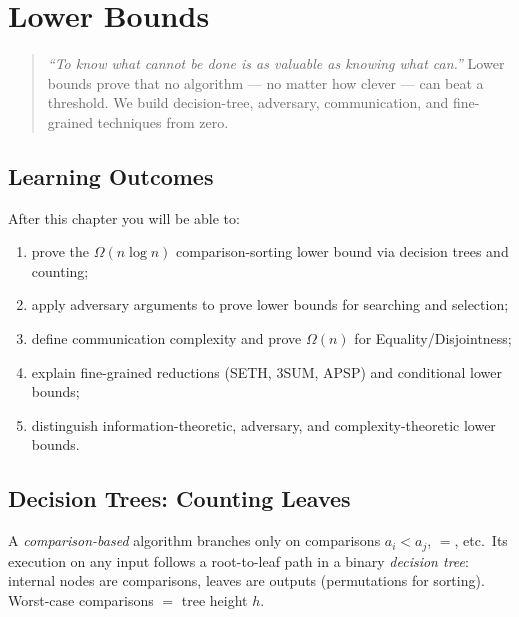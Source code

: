 \chapter{Lower Bounds}
\label{ch:lowerbounds}

\begin{quote}
\emph{``To know what cannot be done is as valuable as knowing what can.''}
Lower bounds prove that no algorithm --- no matter how clever --- can beat a threshold. We build decision-tree, adversary, communication, and fine-grained techniques from zero.
\end{quote}

\noindent{}
\vspace{0.4em}

\section*{Learning Outcomes}
After this chapter you will be able to:
\begin{enumerate}[label=(L\arabic*)]
    \item prove the $\Omega(n\log n)$ comparison-sorting lower bound via decision trees and counting;
    \item apply adversary arguments to prove lower bounds for searching and selection;
    \item define communication complexity and prove $\Omega(n)$ for Equality/Disjointness;
    \item explain fine-grained reductions (SETH, 3SUM, APSP) and conditional lower bounds;
    \item distinguish information-theoretic, adversary, and complexity-theoretic lower bounds.
\end{enumerate}

\section{Decision Trees: Counting Leaves}
\label{sec:decision-trees}

A \emph{comparison-based} algorithm branches only on comparisons $a_i<a_j$, $=$, etc.\ Its execution on any input follows a root-to-leaf path in a binary \emph{decision tree}: internal nodes are comparisons, leaves are outputs (permutations for sorting). Worst-case comparisons $=$ tree height $h$.

